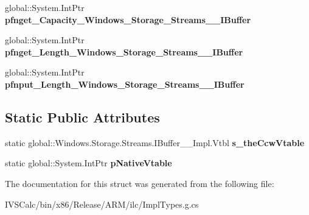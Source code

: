 \begin{DoxyCompactItemize}
global\+::\+System.\+Int\+Ptr {\bfseries pfnget\+\_\+\+Capacity\+\_\+\+Windows\+\_\+\+Storage\+\_\+\+Streams\+\_\+\+\_\+\+I\+Buffer}
\item 
\mbox{\label{struct_windows_1_1_storage_1_1_streams_1_1_i_buffer_____impl_1_1_vtbl_a3ca29706fdf8dd3ee656df7cdc49b6df}} 
global\+::\+System.\+Int\+Ptr {\bfseries pfnget\+\_\+\+Length\+\_\+\+Windows\+\_\+\+Storage\+\_\+\+Streams\+\_\+\+\_\+\+I\+Buffer}
\item 
\mbox{\label{struct_windows_1_1_storage_1_1_streams_1_1_i_buffer_____impl_1_1_vtbl_a3b7c6149797bcfde7ef3b72721b93fb8}} 
global\+::\+System.\+Int\+Ptr {\bfseries pfnput\+\_\+\+Length\+\_\+\+Windows\+\_\+\+Storage\+\_\+\+Streams\+\_\+\+\_\+\+I\+Buffer}
\end{DoxyCompactItemize}
\subsection*{Static Public Attributes}
\begin{DoxyCompactItemize}
\item 
\mbox{\label{struct_windows_1_1_storage_1_1_streams_1_1_i_buffer_____impl_1_1_vtbl_a18fbdfab75554368855d9c63b0cd6028}} 
static global\+::\+Windows.\+Storage.\+Streams.\+I\+Buffer\+\_\+\+\_\+\+Impl.\+Vtbl {\bfseries s\+\_\+the\+Ccw\+Vtable}
\item 
\mbox{\label{struct_windows_1_1_storage_1_1_streams_1_1_i_buffer_____impl_1_1_vtbl_af1804b4a439126694ddc75d2de4c9972}} 
static global\+::\+System.\+Int\+Ptr {\bfseries p\+Native\+Vtable}
\end{DoxyCompactItemize}


The documentation for this struct was generated from the following file\+:\begin{DoxyCompactItemize}
\item 
I\+V\+S\+Calc/bin/x86/\+Release/\+A\+R\+M/ilc/Impl\+Types.\+g.\+cs\end{DoxyCompactItemize}
